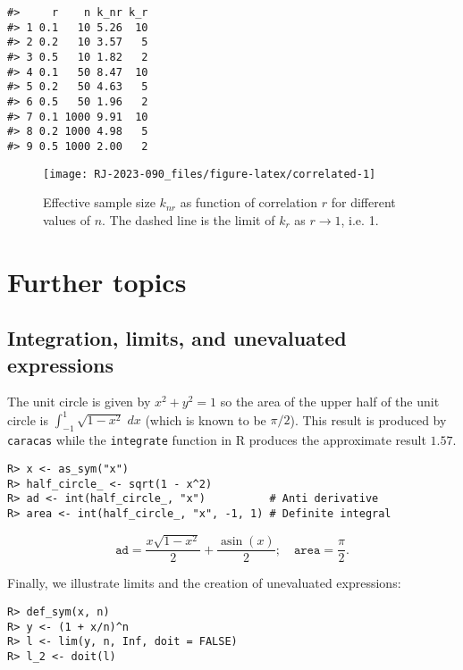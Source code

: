 \begin{verbatim}
#>     r    n k_nr k_r
#> 1 0.1   10 5.26  10
#> 2 0.2   10 3.57   5
#> 3 0.5   10 1.82   2
#> 4 0.1   50 8.47  10
#> 5 0.2   50 4.63   5
#> 6 0.5   50 1.96   2
#> 7 0.1 1000 9.91  10
#> 8 0.2 1000 4.98   5
#> 9 0.5 1000 2.00   2
\end{verbatim}

\begin{figure}[h]
\texttt{[image: RJ-2023-090\_files/figure-latex/correlated-1]} \caption{Effective sample size $k_{nr}$ as function of correlation $r$ for different values of $n$. The dashed line is the limit of $k_r$ as $r \rightarrow 1$, i.e. 1. }\label{fig:correlated}
\end{figure}

\hypertarget{further-topics}{%
\section{Further topics}\label{further-topics}}

\hypertarget{integration-limits-and-unevaluated-expressions}{%
\subsection{Integration, limits, and unevaluated expressions}\label{integration-limits-and-unevaluated-expressions}}

The unit circle is given by \(x^2 + y^2 = 1\) so the area of the upper
half of the unit circle is \(\int_{-1}^1 \sqrt{1-x^2}\; dx\) (which is
known to be \(\pi/2\)). This result is produced by \texttt{caracas} while the
\texttt{integrate} function in R produces the approximate result \(1.57\).

\begin{verbatim}
R> x <- as_sym("x")
R> half_circle_ <- sqrt(1 - x^2)
R> ad <- int(half_circle_, "x")          # Anti derivative
R> area <- int(half_circle_, "x", -1, 1) # Definite integral
\end{verbatim}

\begin{equation}
\texttt{ad} = \frac{x \sqrt{1 - x^{2}}}{2} + \frac{\operatorname{asin}{\left(x \right)}}{2}; \quad
\texttt{area} = \frac{\pi}{2}.
\end{equation}

Finally, we illustrate limits and the creation of unevaluated expressions:

\begin{verbatim}
R> def_sym(x, n)
R> y <- (1 + x/n)^n
R> l <- lim(y, n, Inf, doit = FALSE)
R> l_2 <- doit(l)
\end{verbatim}

